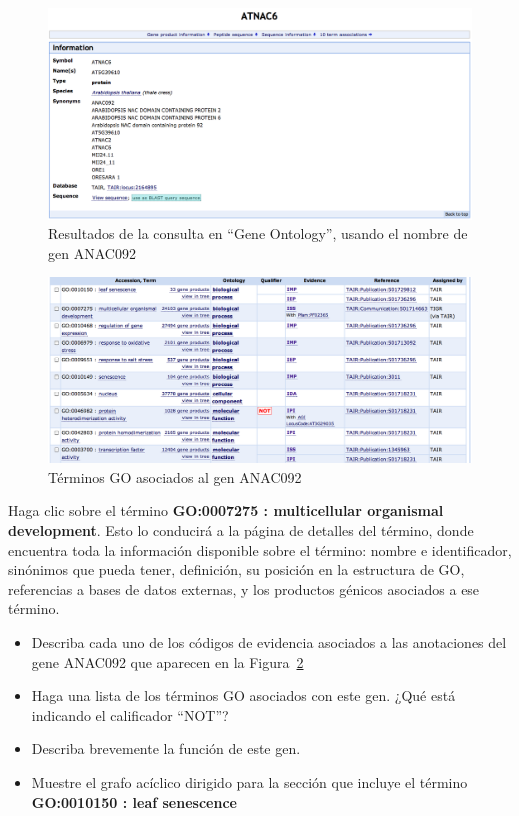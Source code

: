 \documentclass[letter,11pt]{book}
\begin{document}
\begin{figure}[ht]
\centering
   \includegraphics[width=15cm]{Figs/QueryGO2.png}
  \caption{\label{QueryGO2}Resultados de la consulta en ``Gene Ontology'', usando el nombre de gen ANAC092}
\end{figure}

\begin{figure}[ht]
\centering
   \includegraphics[width=15cm]{Figs/QueryGO3.png}
  \caption{\label{QueryGO3}Términos GO asociados al gen ANAC092}
\end{figure}

Haga clic sobre el término \textbf{GO:0007275 : multicellular organismal development}. Esto lo conducirá a la página de detalles del término, donde encuentra toda la información disponible sobre el término: nombre e identificador, sinónimos que pueda tener, definición, su posición en la estructura de GO, referencias a bases de datos externas, y los productos génicos asociados a ese término.

{\color{red}
\begin{itemize}
\item Describa cada uno de los códigos de evidencia asociados a las anotaciones del gene ANAC092 que aparecen en la Figura~\ref{QueryGO3}
\item Haga una lista de los términos GO asociados con este gen. ¿Qué está indicando el calificador ``NOT''?
\item Describa brevemente la función de este gen.
\item Muestre el grafo acíclico dirigido para la sección que incluye el término \textbf{GO:0010150 : leaf senescence}
\end{itemize}
}
\end{document}
